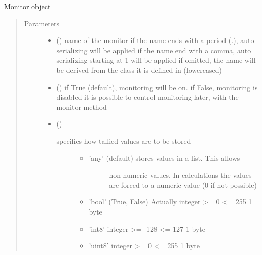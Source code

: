\documentclass[letterpaper,10pt,english]{sphinxmanual}
\begin{document}
\begin{fulllineitems}
\label{\detokenize{Reference:salabim.Monitor}}
Monitor object
\begin{quote}\begin{description}
\item[{Parameters}] \leavevmode\begin{itemize}
\item {} 
 () \textendash{} name of the monitor 
if the name ends with a period (.),
auto serializing will be applied 
if the name end with a comma,
auto serializing starting at 1 will be applied 
if omitted, the name will be derived from the class
it is defined in (lowercased)

\item {} 
 () \textendash{} if True (default), monitoring will be on. 
if False, monitoring is disabled 
it is possible to control monitoring later,
with the monitor method

\item {} 
 () \textendash{} \begin{description}
\item[{specifies how tallied values are to be stored}] \leavevmode\begin{itemize}
\item {} \begin{description}
\item[{’any’ (default) stores values in a list. This allows}] \leavevmode
non numeric values. In calculations the values are
forced to a numeric value (0 if not possible)

\end{description}

\item {} 
’bool’ (True, False) Actually integer \textgreater{}= 0 \textless{}= 255 1 byte

\item {} 
’int8’ integer \textgreater{}= -128 \textless{}= 127 1 byte

\item {} 
’uint8’ integer \textgreater{}= 0 \textless{}= 255 1 byte


\end{itemize}
\end{description}
\end{itemize}
\end{description}
\end{quote}
\end{fulllineitems}
\end{document}
